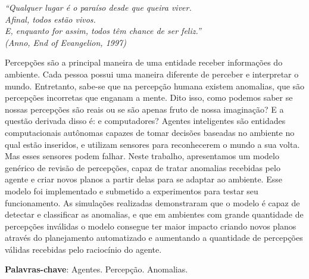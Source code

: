 \begin{epigrafe}
	\vspace*{\fill}
	\begin{flushright}
		\textit{``Qualquer lugar é o paraíso desde que queira viver.\\
		    Afinal, todos estão vivos.\\
		    E, enquanto for assim, todos têm chance de ser feliz.''\\
			(Anno, End of Evangelion, 1997)}
	\end{flushright}
\end{epigrafe}


\setlength{\absparsep}{18pt} %
\begin{resumo}
	\SingleSpacing
	Percepções são a principal maneira de uma entidade receber informações do ambiente. Cada pessoa possui uma maneira diferente de perceber e interpretar o mundo. Entretanto, sabe-se que na percepção humana existem anomalias, que são percepções incorretas que enganam a mente. Dito isso, como podemos saber se nossas percepções são reais ou se são apenas fruto de nossa imaginação? E a questão derivada disso é: e computadores? Agentes inteligentes são entidades computacionais autônomas capazes de tomar decisões baseadas no ambiente no qual estão inseridos, e utilizam sensores para reconhecerem o mundo a sua volta. Mas esses sensores podem falhar. Neste trabalho, apresentamos um modelo genérico de revisão de percepções, capaz de tratar anomalias recebidas pelo agente e criar novos planos a partir delas para se adaptar ao ambiente. Esse modelo foi implementado e submetido a experimentos para testar seu funcionamento. As simulações realizadas demonstraram que o modelo é capaz de detectar e classificar as anomalias, e que em ambientes com grande quantidade de percepções inválidas o modelo consegue ter maior impacto criando novos planos através do planejamento automatizado e aumentando a quantidade de percepções válidas recebidas pelo raciocínio do agente.
	
	\textbf{Palavras-chave}: Agentes. Percepção. Anomalias.
\end{resumo}

